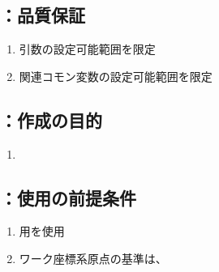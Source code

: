 \subsection{\KCurvedOutcutRLeft：品質保証}
\begin{enumerate}[label*=\sarrow]
\item {}引数の設定可能範囲を限定
\item 関連コモン変数の設定可能範囲を限定
\end{enumerate}



\clearpage


\subsection{\KKeywayConerLeft：作成の目的}
\begin{enumerate}[label*=\sarrow]
\item \KeywayMilling
\end{enumerate}


\subsection{\KKeywayConerLeft：使用の前提条件}
\begin{enumerate}[label*=\sarrow]
\item \KeywayMilling 用\SideCutter を使用
\item {}ワーク座標系原点の基準は、\KeywayCenter
\end{enumerate}



